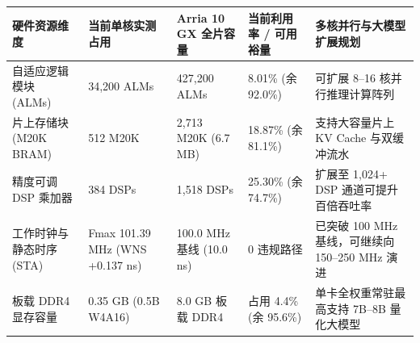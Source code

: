 \documentclass[11pt,a4paper]{article}
\begin{document}
{\footnotesize\renewcommand{\arraystretch}{1.14}\begin{longtable}{@{}L{0.19\textwidth}L{0.16\textwidth}L{0.16\textwidth}L{0.15\textwidth}L{0.24\textwidth}@{}}\toprule

\textbf{硬件资源维度} & \textbf{当前单核实测占用} & \textbf{Arria 10 GX 全片容量} & \textbf{当前利用率 /\allowbreak{} 可用裕量} & \textbf{多核并行与大模型扩展规划}\\\midrule\endhead

自适应逻辑模块 (\allowbreak{}ALMs)\allowbreak{} & 34,\allowbreak{}200 ALMs & 427,\allowbreak{}200 ALMs & 8.01\% (\allowbreak{}余 92.0\%)\allowbreak{} & 可扩展 8–16 核并行推理计算阵列\\[2pt]

片上存储块 (\allowbreak{}M20K BRAM)\allowbreak{} & 512 M20K & 2,\allowbreak{}713 M20K (\allowbreak{}6.7 MB)\allowbreak{} & 18.87\% (\allowbreak{}余 81.1\%)\allowbreak{} & 支持大容量片上 KV Cache 与双缓冲流水\\[2pt]

精度可调 DSP 乘加器 & 384 DSPs & 1,\allowbreak{}518 DSPs & 25.30\% (\allowbreak{}余 74.7\%)\allowbreak{} & 扩展至 1,\allowbreak{}024+\allowbreak{} DSP 通道可提升百倍吞吐率\\[2pt]

工作时钟与静态时序 (\allowbreak{}STA)\allowbreak{} & Fmax 101.39 MHz (\allowbreak{}WNS +\allowbreak{}0.137 ns)\allowbreak{} & 100.0 MHz 基线 (\allowbreak{}10.0 ns)\allowbreak{} & 0 违规路径 & 已突破 100 MHz 基线，可继续向 150–250 MHz 演进\\[2pt]

板载 DDR4 显存容量 & 0.35 GB (\allowbreak{}0.5B W4A16)\allowbreak{} & 8.0 GB 板载 DDR4 & 占用 4.4\% (\allowbreak{}余 95.6\%)\allowbreak{} & 单卡全权重常驻最高支持 7B–8B 量化大模型\\[2pt]

\bottomrule\end{longtable}}
\end{document}
